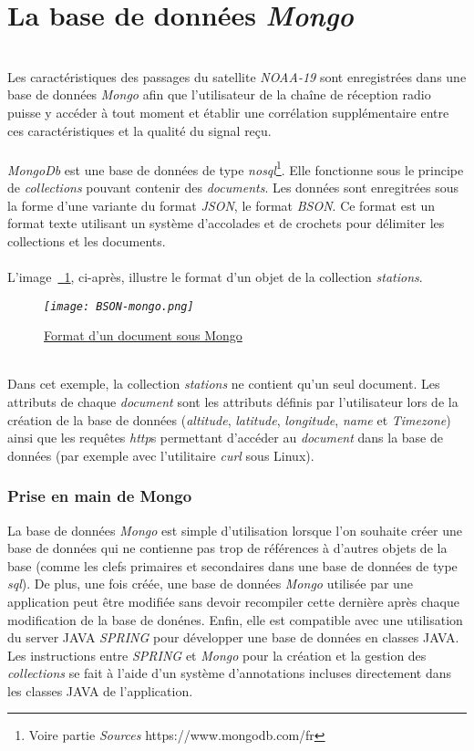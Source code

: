 \documentclass[12pt,fleqn]{book} %
\begin{document}
\section{La base de données \emph{Mongo}}
~\\\indent Les caractéristiques des passages du satellite \emph{NOAA-19} sont enregistrées dans une base de données \emph{Mongo} afin que l'utilisateur de la chaîne de réception radio puisse y accéder à tout moment et établir une corrélation supplémentaire entre ces caractéristiques et la qualité du signal reçu.
~\\\\\emph{MongoDb} est une base de données de type \emph{nosql}\footnote{Voire partie \emph{Sources} https://www.mongodb.com/fr}. Elle fonctionne sous le principe de \emph{collections} pouvant contenir des \emph{documents}. Les données sont enregitrées sous la forme d'une variante du format \emph{JSON}, le format \emph{BSON}. Ce format est un format texte utilisant un système d'accolades et de crochets pour délimiter les collections et les documents. 
~\\\\L'image~\underline{\color{blue}~\ref{BSON-mongo}}, ci-après, illustre le format d'un objet de la collection \emph{stations}.
~\\
\begin{figure}[H]
	\centering
	\itshape
	\texttt{[image: BSON-mongo.png]}
	\caption{\label{BSON-mongo} \underline{Format d'un document sous Mongo}}
\end{figure}
~\\Dans cet exemple, la collection \emph{stations} ne contient qu'un seul document. Les attributs de chaque \emph{document} sont les attributs définis par l'utilisateur lors de la création de la base de données (\emph{altitude}, \emph{latitude}, \emph{longitude}, \emph{name} et \emph{Timezone}) ainsi que les requêtes \emph{http}s permettant d'accéder au \emph{document} dans la base de données (par exemple avec l'utilitaire \emph{curl} sous Linux).
\subsubsection{Prise en main de Mongo}
\noindent La base de données \emph{Mongo} est simple d'utilisation lorsque l'on souhaite créer une base de données qui ne contienne pas trop de références à d'autres objets de la base (comme les clefs primaires et secondaires dans une base de données de type \emph{sql}). De plus, une fois créée, une base de données \emph{Mongo} utilisée par une application peut être modifiée sans devoir recompiler cette dernière après chaque modification de la base de donénes. Enfin, elle est compatible avec une utilisation du server JAVA \emph{SPRING} pour développer une base de données en classes JAVA. Les instructions entre \emph{SPRING} et \emph{Mongo} pour la création et la gestion des \emph{collections} se fait à l'aide d'un système d'annotations incluses directement dans les classes JAVA de l'application.
\end{document}
